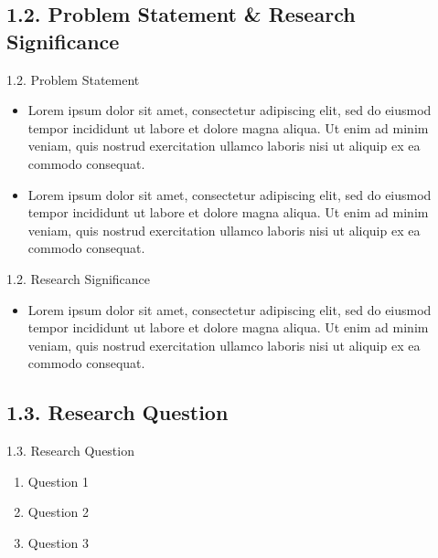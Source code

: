 \documentclass[11pt]{beamer}%
\begin{document}
\subsection{1.2. Problem Statement \& Research Significance}
\begin{frame}{1.2. Problem Statement}
	\begin{itemize}
		\item Lorem ipsum dolor sit amet, consectetur adipiscing elit, sed do eiusmod tempor incididunt ut labore et dolore magna aliqua. Ut enim ad minim veniam, quis nostrud exercitation ullamco laboris nisi ut aliquip ex ea commodo consequat.
		\item Lorem ipsum dolor sit amet, consectetur adipiscing elit, sed do eiusmod tempor incididunt ut labore et dolore magna aliqua. Ut enim ad minim veniam, quis nostrud exercitation ullamco laboris nisi ut aliquip ex ea commodo consequat.
	\end{itemize}
\end{frame}

\begin{frame}{1.2. Research Significance}
	\begin{itemize}
	\item Lorem ipsum dolor sit amet, consectetur adipiscing elit, sed do eiusmod tempor incididunt ut labore et dolore magna aliqua. Ut enim ad minim veniam, quis nostrud exercitation ullamco laboris nisi ut aliquip ex ea commodo consequat.
	\end{itemize}
\end{frame}

\subsection{1.3. Research Question}
\begin{frame}{1.3. Research Question}
	\begin{enumerate}
		\item Question 1
		\item Question 2
		\item Question 3
	\end{enumerate}
\end{frame}

\end{document}
